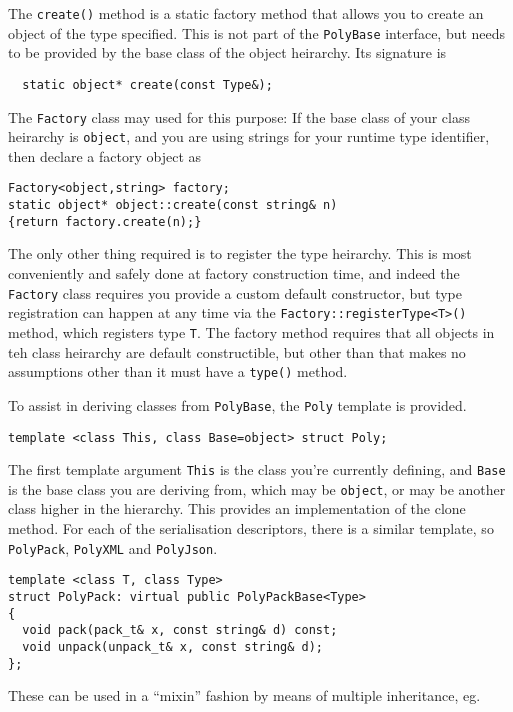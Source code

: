 The \verb+create()+ method is a static factory method that allows you to
create an object of the type  specified. This is not part of the
\verb+PolyBase+ interface, but needs to be provided by the base class
of the object heirarchy. Its signature is
\begin{verbatim}
  static object* create(const Type&);
\end{verbatim}

The \verb+Factory+ class may used for this purpose: If the base class
of your class heirarchy is \verb+object+, and you are using strings
for your runtime type identifier, then declare a factory object as
\begin{verbatim}
Factory<object,string> factory;
static object* object::create(const string& n)
{return factory.create(n);}
\end{verbatim}

The only other thing required is to register the type heirarchy. This
is most conveniently and safely done at factory construction time, and indeed the
\verb+Factory+ class requires you provide a custom default
constructor, but type registration can happen at any time via the
\verb+Factory::registerType<T>()+ method, which registers type
\verb+T+. The factory method requires that all objects in teh class
heirarchy are default constructible, but other than that makes no
assumptions other than it must have a \verb+type()+ method.

To assist in deriving classes from \verb+PolyBase+, the \verb+Poly+ template
is provided.
\begin{verbatim}
template <class This, class Base=object> struct Poly;
\end{verbatim}
The first template argument \verb+This+ is the class you're currently defining,
and \verb+Base+ is the base class you are deriving from, which may be
\verb+object+, or may be another class higher in the
hierarchy. This provides an implementation of the clone method. For
each of the serialisation descriptors, there is a similar template, so
\verb+PolyPack+, \verb+PolyXML+ and
\verb+PolyJson+. 
\begin{verbatim}
template <class T, class Type>
struct PolyPack: virtual public PolyPackBase<Type>
{
  void pack(pack_t& x, const string& d) const;
  void unpack(unpack_t& x, const string& d);
};
\end{verbatim}
These can be used in a ``mixin'' fashion by means of multiple
inheritance, eg.

